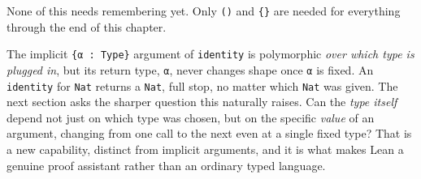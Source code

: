 None of this needs remembering yet. Only \texttt{()} and \texttt{\{\}} are needed for everything through the end of this chapter.

The implicit \texttt{\{α : Type\}} argument of \texttt{identity} is polymorphic \emph{over which type is plugged in}, but its return type, \texttt{α}, never changes shape once \texttt{α} is fixed. An \texttt{identity} for \texttt{Nat} returns a \texttt{Nat}, full stop, no matter which \texttt{Nat} was given. The next section asks the sharper question this naturally raises. Can the \emph{type itself} depend not just on which type was chosen, but on the specific \emph{value} of an argument, changing from one call to the next even at a single fixed type? That is a new capability, distinct from implicit arguments, and it is what makes Lean a genuine proof assistant rather than an ordinary typed language.
